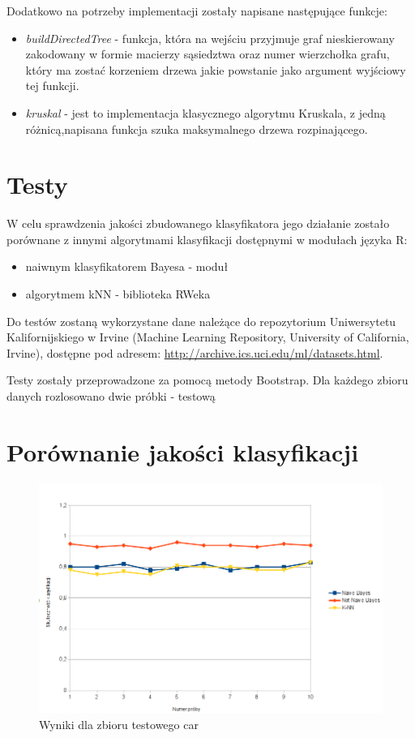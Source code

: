 \documentclass[paper=a4, fontsize=11pt]{scrartcl} %
\numberwithin{equation}{section} %
\numberwithin{figure}{section} %
\numberwithin{table}{section} %
\begin{document}
Dodatkowo na potrzeby implementacji zostały napisane następujące funkcje:
\begin{itemize}
 \item \textit{buildDirectedTree} - funkcja, która na wejściu przyjmuje graf nieskierowany zakodowany w formie macierzy sąsiedztwa oraz numer wierzchołka grafu, który ma zostać korzeniem drzewa jakie powstanie jako argument wyjściowy tej funkcji.
 \item \textit{kruskal} - jest to implementacja klasycznego algorytmu Kruskala, z jedną różnicą,napisana funkcja szuka maksymalnego drzewa rozpinającego.
\end{itemize}

\section{Testy}

W celu sprawdzenia jakości zbudowanego klasyfikatora jego działanie zostało porównane z innymi algorytmami klasyfikacji dostępnymi w modułach języka R: \\
\begin{itemize}
\item naiwnym klasyfikatorem Bayesa - moduł 
\item algorytmem kNN - biblioteka RWeka \cite{RWeka}
\end{itemize}

Do testów zostaną wykorzystane dane należące do repozytorium Uniwersytetu Kalifornijskiego w Irvine (Machine Learning Repository, University of California, Irvine), dostępne pod adresem: \url{http://archive.ics.uci.edu/ml/datasets.html}.

Testy zostały przeprowadzone za pomocą metody Bootstrap. Dla każdego zbioru danych rozlosowano dwie próbki - testową 

\section{Porównanie jakości klasyfikacji }

\begin{figure}[h]
 \centering
\includegraphics[width=150mm]{car.png}
 \caption{Wyniki dla zbioru testowego car}
 \label{fig:model_drzewa}
\end{figure}
\end{document}
